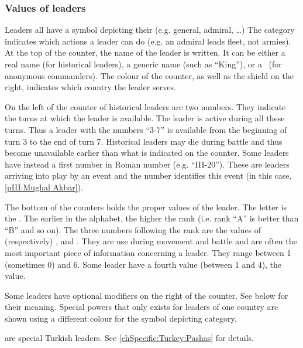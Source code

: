 \subsubsection{Values of leaders}
 Leaders all have a symbol depicting their
 (e.g. general, admiral, \dots) The category indicates which
actions a leader can do (e.g. an admiral leads fleet, not armies).
\bparag At the top of the counter, the name of the leader is written. It can
be either a real name (for historical leaders), a generic name (such as
``King''), or a \anonyme\ (for anonymous commanders).
\bparag The colour of the counter, as well as the shield on the right,
indicates which country the leader serves.

 On the left of the counter of historical leaders are
two numbers. They indicate the turns at which the leader is available.
\bparag The leader is active during all these turns. Thus a leader with the
numbers ``3-7'' is available from the beginning of turn 3 to the end of turn
7.
\bparag Historical leaders may die during battle and thus become unavailable
earlier than what is indicated on the counter.
\bparag Some leaders have instead a first number in Roman number
(e.g. ``III-20''). These are leaders arriving into play by an event and the
number identifies this event (in this case, \ref{pIII:Mughal Akbar}).

\aparag[Values] The bottom of the counters holds the proper values of the
leader.
\bparag The letter is the . The earlier in the alphabet, the
higher the rank (i.e. rank ``A'' is better than ``B'' and so on).
\bparag The three numbers following the rank are the values of (respectively)
,  and . They are use during
movement and battle and are often the most important piece of information
concerning a leader. They range between 1 (sometimes 0) and 6.
\bparag Some leader have a fourth value (between 1 and 4), the 
value.

\aparag[Modifiers] Some leaders have optional modifiers on the right of the
counter. See below for their meaning.
\bparag Special powers that only exists for leaders of one country are shown
using a different colour for the symbol depicting category.

\aparag[Pachas] are special Turkish leaders. See
\ref{chSpecific:Turkey:Pashas} for details.


